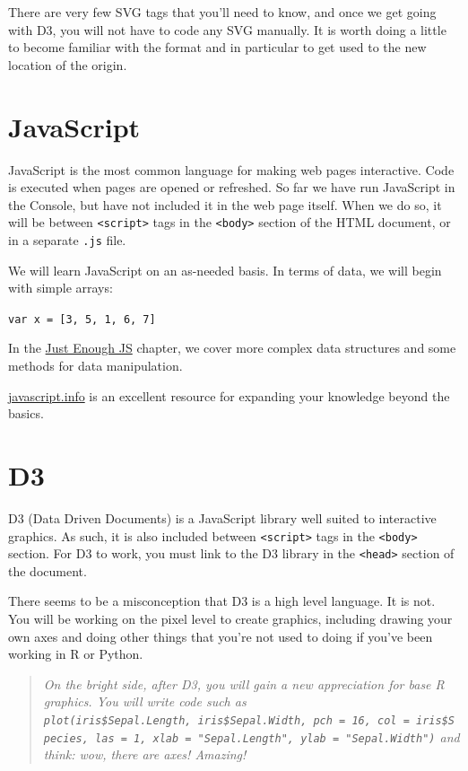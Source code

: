 \documentclass[openany]{book}
\begin{document}
There are very few SVG tags that you'll need to know, and once we get going with D3, you will not have to code any SVG manually. It is worth doing a little to become familiar with the format and in particular to get used to the new location of the origin.

\hypertarget{javascript}{%
\section{JavaScript }\label{javascript}}

JavaScript is the most common language for making web pages interactive. Code is executed when pages are opened or refreshed. So far we have run JavaScript in the Console, but have not included it in the web page itself. When we do so, it will be between \texttt{\textless{}script\textgreater{}} tags in the \texttt{\textless{}body\textgreater{}} section of the HTML document, or in a separate \texttt{.js} file.

We will learn JavaScript on an as-needed basis. In terms of data, we will begin with simple arrays:

\texttt{var\ x\ =\ {[}3,\ 5,\ 1,\ 6,\ 7{]}}

In the \href{just-enough-js.html}{Just Enough JS} chapter, we cover more complex data structures and some methods for data manipulation.

\url{javascript.info} is an excellent resource for expanding your knowledge beyond the basics.

\hypertarget{d3}{%
\section{D3 }\label{d3}}

D3 (Data Driven Documents) is a JavaScript library well suited to interactive graphics. As such, it is also included between \texttt{\textless{}script\textgreater{}} tags in the \texttt{\textless{}body\textgreater{}} section. For D3 to work, you must link to the D3 library in the \texttt{\textless{}head\textgreater{}} section of the document.

There seems to be a misconception that D3 is a high level language. It is not. You will be working on the pixel level to create graphics, including drawing your own axes and doing other things that you're not used to doing if you've been working in R or Python.

\begin{quote}
 \emph{On the bright side, after D3, you will gain a new appreciation for base R graphics. You will write code such as \texttt{plot(iris\$Sepal.Length,\ iris\$Sepal.Width,\ pch\ =\ 16,\ col\ =\ iris\$Species,\ las\ =\ 1,\ xlab\ =\ "Sepal.Length",\ ylab\ =\ "Sepal.Width")} and think: wow, there are axes! Amazing!}
\end{quote}
\end{document}
